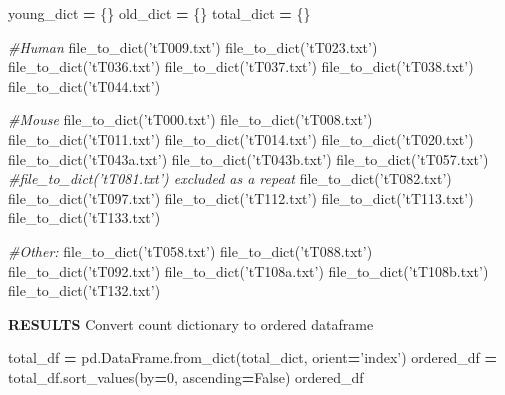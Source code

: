 \documentclass[
]{article}
\newenvironment{Shaded}{\begin{snugshade}}{\end{snugshade}}
\newcommand{\CommentTok}[1]{\textcolor[rgb]{0.56,0.35,0.01}{\textit{#1}}}
\newcommand{\DecValTok}[1]{\textcolor[rgb]{0.00,0.00,0.81}{#1}}
\newcommand{\NormalTok}[1]{#1}
\newcommand{\OperatorTok}[1]{\textcolor[rgb]{0.81,0.36,0.00}{\textbf{#1}}}
\newcommand{\StringTok}[1]{\textcolor[rgb]{0.31,0.60,0.02}{#1}}
\newcommand{\VariableTok}[1]{\textcolor[rgb]{0.00,0.00,0.00}{#1}}
\begin{document}
\begin{Shaded}
\begin{Highlighting}[]
\NormalTok{young_dict }\OperatorTok{=}\NormalTok{ \{\}}
\NormalTok{old_dict }\OperatorTok{=}\NormalTok{ \{\}}
\NormalTok{total_dict }\OperatorTok{=}\NormalTok{ \{\}}

\CommentTok{#Human}
\NormalTok{file_to_dict(}\StringTok{'tT009.txt'}\NormalTok{)}
\NormalTok{file_to_dict(}\StringTok{'tT023.txt'}\NormalTok{)}
\NormalTok{file_to_dict(}\StringTok{'tT036.txt'}\NormalTok{)}
\NormalTok{file_to_dict(}\StringTok{'tT037.txt'}\NormalTok{)}
\NormalTok{file_to_dict(}\StringTok{'tT038.txt'}\NormalTok{)}
\NormalTok{file_to_dict(}\StringTok{'tT044.txt'}\NormalTok{)}

\CommentTok{#Mouse}
\NormalTok{file_to_dict(}\StringTok{'tT000.txt'}\NormalTok{)}
\NormalTok{file_to_dict(}\StringTok{'tT008.txt'}\NormalTok{)}
\NormalTok{file_to_dict(}\StringTok{'tT011.txt'}\NormalTok{)}
\NormalTok{file_to_dict(}\StringTok{'tT014.txt'}\NormalTok{)}
\NormalTok{file_to_dict(}\StringTok{'tT020.txt'}\NormalTok{)}
\NormalTok{file_to_dict(}\StringTok{'tT043a.txt'}\NormalTok{)}
\NormalTok{file_to_dict(}\StringTok{'tT043b.txt'}\NormalTok{)}
\NormalTok{file_to_dict(}\StringTok{'tT057.txt'}\NormalTok{)}
\CommentTok{#file_to_dict('tT081.txt') excluded as a repeat}
\NormalTok{file_to_dict(}\StringTok{'tT082.txt'}\NormalTok{)}
\NormalTok{file_to_dict(}\StringTok{'tT097.txt'}\NormalTok{)}
\NormalTok{file_to_dict(}\StringTok{'tT112.txt'}\NormalTok{)}
\NormalTok{file_to_dict(}\StringTok{'tT113.txt'}\NormalTok{)}
\NormalTok{file_to_dict(}\StringTok{'tT133.txt'}\NormalTok{)}

\CommentTok{#Other:}
\NormalTok{file_to_dict(}\StringTok{'tT058.txt'}\NormalTok{)}
\NormalTok{file_to_dict(}\StringTok{'tT088.txt'}\NormalTok{)}
\NormalTok{file_to_dict(}\StringTok{'tT092.txt'}\NormalTok{)}
\NormalTok{file_to_dict(}\StringTok{'tT108a.txt'}\NormalTok{)}
\NormalTok{file_to_dict(}\StringTok{'tT108b.txt'}\NormalTok{)}
\NormalTok{file_to_dict(}\StringTok{'tT132.txt'}\NormalTok{)}
\end{Highlighting}
\end{Shaded}

\textbf{RESULTS} Convert count dictionary to ordered dataframe

\begin{Shaded}
\begin{Highlighting}[]
\NormalTok{total_df }\OperatorTok{=}\NormalTok{ pd.DataFrame.from_dict(total_dict, orient}\OperatorTok{=}\StringTok{'index'}\NormalTok{)}
\NormalTok{ordered_df }\OperatorTok{=}\NormalTok{ total_df.sort_values(by}\OperatorTok{=}\DecValTok{0}\NormalTok{, ascending}\OperatorTok{=}\VariableTok{False}\NormalTok{)}
\NormalTok{ordered_df}
\end{Highlighting}
\end{Shaded}
\end{document}
